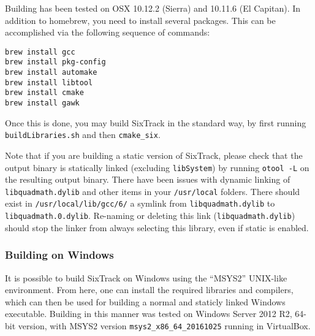 \documentclass[english,BCOR=0mm,DIV=18]{scrartcl}
\begin{document}
Building has been tested on OSX 10.12.2 (Sierra) and 10.11.6 (El Capitan).
In addition to homebrew, you need to install several packages.
This can be accomplished via the following sequence of commands:
\begin{lstlisting}
brew install gcc
brew install pkg-config
brew install automake
brew install libtool
brew install cmake
brew install gawk
\end{lstlisting}
Once this is done, you may build SixTrack in the standard way, by first running \texttt{buildLibraries.sh} and then \texttt{cmake\_six}.


Note that if you are building a static version of SixTrack, please check that the output binary is statically linked (excluding \texttt{libSystem}) by running \texttt{otool -L} on the resulting output binary.
There have been issues with dynamic linking of \texttt{libquadmath.dylib} and other items in your \texttt{/usr/local} folders.
There should exist in \texttt{/usr/local/lib/gcc/6/} a symlink from \texttt{libquadmath.dylib} to \texttt{libquadmath.0.dylib}.
Re-naming or deleting this link (\texttt{libquadmath.dylib}) should stop the linker from always selecting this library, even if static is enabled.

\subsubsection{Building on Windows}

It is possible to build SixTrack on Windows using the ``MSYS2'' UNIX-like environment.
From here, one can install the required libraries and compilers, which can then be used for building a normal and staticly linked Windows executable.
Building in this manner was tested on Windows Server 2012 R2, 64-bit version, with MSYS2 version \texttt{msys2\_x86\_64\_20161025} running in VirtualBox.
\end{document}
